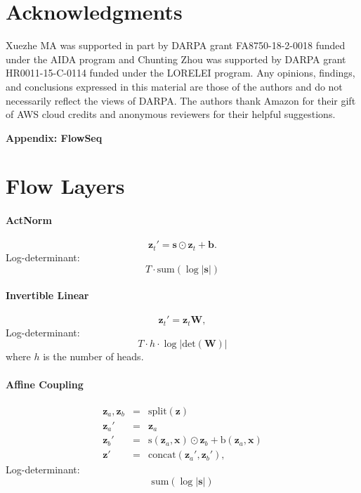 \documentclass[11pt,a4paper]{article}
\newcommand{\xv}{\mathbf{x}}
\newcommand{\zv}{\mathbf{z}}
\begin{document}
\vspace{-1mm}
\section*{Acknowledgments}
Xuezhe MA was supported in part by DARPA grant FA8750-18-2-0018 funded under the AIDA
program and Chunting Zhou was supported by DARPA grant HR0011-15-C-0114 funded under the LORELEI program.
Any opinions, findings, and conclusions expressed in this material are those of the authors and do not necessarily reflect the views of DARPA.
The authors thank Amazon for their gift of AWS cloud credits and anonymous reviewers for their helpful suggestions.




\newpage
\appendix
\onecolumn
\begin{center}
  {\huge {\bf Appendix: FlowSeq}}  
\end{center}

\section{Flow Layers}\label{appendix:flow}
\paragraph{ActNorm}
\begin{displaymath}
\zv_{t}' = \mathbf{s} \odot \zv_{t} + \mathbf{b}.
\end{displaymath}
Log-determinant:
\begin{displaymath}
T \cdot \mathrm{sum}(\log |\mathbf{s}|)
\end{displaymath}

\paragraph{Invertible Linear}
\begin{displaymath}
\zv_{t}' = \zv_{t} \mathbf{W},
\end{displaymath}
Log-determinant:
\begin{displaymath}
T \cdot h \cdot \log |\mathrm{det} (\mathbf{W})|
\end{displaymath}
where $h$ is the number of heads.

\paragraph{Affine Coupling}
\begin{displaymath}
\begin{array}{rcl}
\zv_a, \zv_b & = & \mathrm{split}(\zv) \\
\zv_a' & = & \zv_a \\
\zv_b' & = & \mathrm{s}(\zv_a, \xv) \odot \zv_b + \mathrm{b}(\zv_a, \xv) \\
\zv' & = & \mathrm{concat}(\zv_a', \zv_b'),
\end{array}
\end{displaymath}
Log-determinant:
\begin{displaymath}
\mathrm{sum}(\log |\mathbf{s}|)
\end{displaymath}
\end{document}
